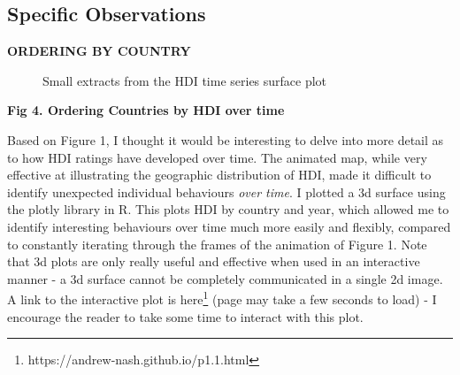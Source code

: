 \documentclass[ 10pt ]{fphw}
\begin{document}
\subsection*{Specific Observations} 

\textbf{ORDERING BY COUNTRY} 

\vspace{1cm}

\hfill \break  

\begin{figure}[hb]
    \centering
    \qquad
    \caption{Small extracts from the HDI time series surface plot}%
    \label{fig:surfaceplot}
\end{figure}

\textbf{Fig 4. Ordering Countries by HDI over time} 

\vspace{0.25cm}

Based on Figure 1, I thought it would be interesting to delve into more detail as to how HDI ratings have developed over time. The animated map, while very effective at illustrating the geographic distribution of HDI, made it difficult to identify unexpected individual behaviours \textit{over time}. I plotted a 3d surface using the plotly library in R. This plots HDI by country and year, which allowed me to identify interesting behaviours over time much more easily and flexibly, compared to constantly iterating through the frames of the animation of Figure 1. Note that 3d plots are only really useful and effective when used in an interactive manner - a 3d surface cannot be completely communicated in a single 2d image. A link to the interactive plot is here\footnote{https://andrew-nash.github.io/p1.1.html} (page may take a few seconds to load) - I encourage the reader to take some time to interact with this plot.
\end{document}
